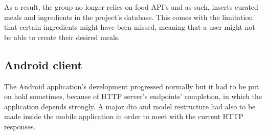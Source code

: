     As a result, the group no longer relies on food API's and as such, inserts curated meals and ingredients 
    in the project's database. 
    This comes with the limitation that certain ingredients might have been missed,
    meaning that a user might not be able to create their desired meals.

    \subsection{Android client}

    The Android application's development progressed normally but it had to be put on hold sometimes, because of HTTP server's endpoints' completion, in which the application
    depends strongly. A major dto and model restructure had also to be made inside the mobile application in order to meet with the current HTTP responses.\\